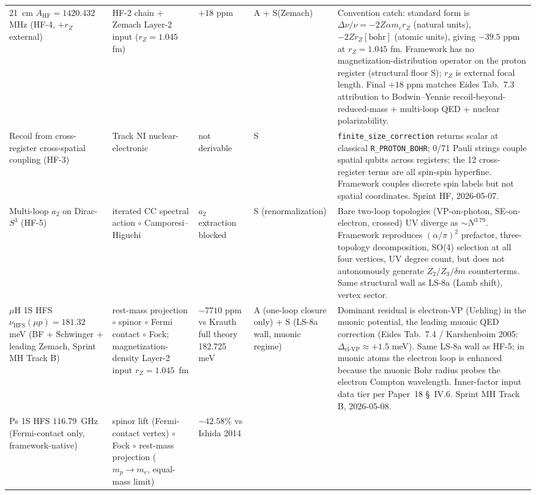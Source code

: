 \documentclass[11pt]{article}
\begin{document}
\begin{table}[h]
\begin{tabular}{p{3.8cm} p{2.5cm} p{1.5cm} p{1.4cm} p{4.5cm}}
21~cm $A_\text{HF} = 1420.432$ MHz (HF-4, $+r_Z$ external) & HF-2 chain
$+$ Zemach Layer-2 input ($r_Z = 1.045$ fm) & $+18$ ppm & A + S(Zemach)
& Convention catch: standard form is $\Delta\nu/\nu = -2 Z\alpha m_e r_Z$
(natural units), $-2 Z r_Z[\text{bohr}]$ (atomic units), giving
$-39.5$ ppm at $r_Z = 1.045$ fm.  Framework has no
magnetization-distribution operator on the proton register
(structural floor S); $r_Z$ is external focal length.  Final $+18$ ppm
matches Eides Tab.~7.3 attribution to Bodwin--Yennie recoil-beyond-
reduced-mass + multi-loop QED + nuclear polarizability. \\
Recoil from cross-register cross-spatial coupling (HF-3) & Track NI
nuclear-electronic & not derivable & S & \texttt{finite\_size\_correction}
returns scalar at classical \texttt{R\_PROTON\_BOHR}; 0/71 Pauli strings
couple spatial qubits across registers; the 12 cross-register terms are
all spin-spin hyperfine.  Framework couples discrete spin labels but
not spatial coordinates.  Sprint HF, 2026-05-07. \\
Multi-loop $a_2$ on Dirac-$S^3$ (HF-5) & iterated CC spectral action
$\circ$ Camporesi--Higuchi & $a_2$ extraction blocked & S (renormalization)
& Bare two-loop topologies (VP-on-photon, SE-on-electron, crossed) UV
diverge as $\sim N^{3.79}$.  Framework reproduces $(\alpha/\pi)^2$
prefactor, three-topology decomposition, SO(4) selection at all four
vertices, UV degree count, but does not autonomously generate $Z_2/Z_3/
\delta m$ counterterms.  Same structural wall as LS-8a (Lamb shift),
vertex sector. \\
$\mu$H 1S HFS $\nu_\text{HFS}(\mu p) = 181.32$ meV (BF + Schwinger +
leading Zemach, Sprint MH Track B) & rest-mass projection $\circ$
spinor $\circ$ Fermi contact $\circ$ Fock; magnetization-density
Layer-2 input $r_Z = 1.045$~fm & $-7710$ ppm vs Krauth full theory
182.725 meV & A (one-loop closure only) + S (LS-8a wall, muonic regime)
& Dominant residual is electron-VP (Uehling) in the muonic potential,
the leading muonic QED correction (Eides Tab.~7.4 / Karshenboim 2005:
$\Delta_\text{el-VP} \approx +1.5$ meV).  Same LS-8a wall as HF-5; in
muonic atoms the electron loop is enhanced because the muonic Bohr
radius probes the electron Compton wavelength.  Inner-factor input
data tier per Paper~18 \S~IV.6.  Sprint MH Track B, 2026-05-08. \\
Ps 1S HFS $116.79$~GHz (Fermi-contact only, framework-native) & spinor
lift (Fermi-contact vertex) $\circ$ Fock $\circ$ rest-mass projection
($m_p \to m_e$, equal-mass limit) & $-42.58\%$ vs Ishida 2014

\end{tabular}
\end{table}
\end{document}
